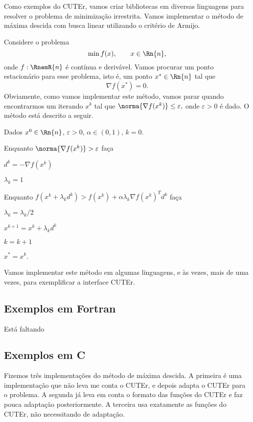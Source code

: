\documentclass[letterpaper,11pt]{article}
\numberwithin{equation}{section}
\begin{document}
Como exemplos do CUTEr, vamos criar bibliotecas em diversas linguagens para resolver o 
problema de minimização irrestrita. 
Vamos implementar o método de máxima descida com busca linear utilizando o
critério de Armijo.

Considere o problema
\begin{equation}
 \min f(x), \qquad x \in \Rn{n},
\end{equation}
onde $f:\RnemR{n}$ é contínua e derivável. Vamos procurar um ponto estacionário para esse
problema, isto é, um ponto $x^* \in \Rn{n}$ tal que $$\nabla f(x^*) = 0.$$
Obviamente, como vamos implementar este método, vamos parar quando encontrarmos um
iterando $x^k$ tal que $\norma{\nabla f(x^k)} \leq \varepsilon,$ onde $\varepsilon > 0$ é
dado. O método está descrito a seguir.
\begin{algorithm}
 \item Dados $x^0 \in \Rn{n}$, $\varepsilon > 0$, $\alpha \in (0,1)$, $k = 0$.
 \item Enquanto $\norma{\nabla f(x^k)} > \varepsilon$ faça
 \begin{algorithm} 
  \item $d^k = -\nabla f(x^k)$
  \item $\lambda_k = 1$
  \item Enquanto $f(x^k + \lambda_kd^k) > f(x^k) + \alpha \lambda_k \nabla f(x^k)^Td^k$ faça
  \begin{algorithm}
   \item $\lambda_k = \lambda_k/2$
  \end{algorithm}
  \item $x^{k+1} = x^k + \lambda_kd^k$
  \item $k = k + 1$
 \end{algorithm}
 \item $x^* = x^k$.
\end{algorithm}
Vamos implementar este método em algumas linguagens, e às vezes, mais de uma vezes, para
exemplificar a interface CUTEr.

\subsection{Exemplos em Fortran}

Está faltando

\subsection{Exemplos em C}

Fizemos três implementações do método de máxima descida. A primeira é uma implementação
que não leva me conta o CUTEr, e depois adapta o CUTEr para o problema. A segunda já leva
em conta o formato das funções do CUTEr e faz pouca adaptação posteriormente. A terceira
usa exatamente as funções do CUTEr, não necessitando de adaptação.
\end{document}

